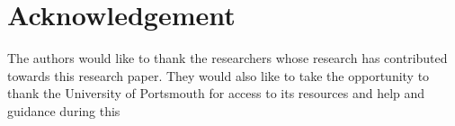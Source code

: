 \section*{Acknowledgement}
The authors would like to thank the researchers whose research has contributed towards this research paper. They would also like to take the opportunity to thank the University of Portsmouth for access to its resources and help and guidance during this 